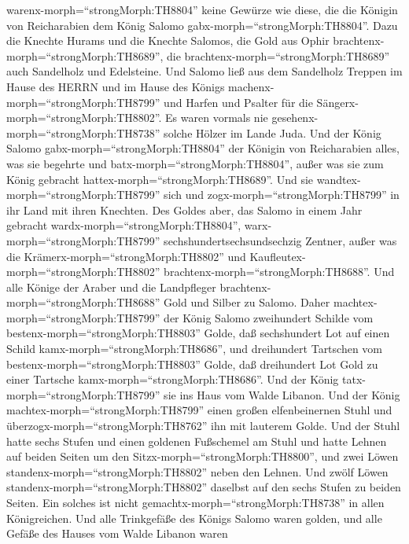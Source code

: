 warenx-morph=``strongMorph:TH8804'' keine Gewürze wie diese, die die
Königin von Reicharabien dem König Salomo
gabx-morph=``strongMorph:TH8804''.  Dazu die Knechte Hurams
und die Knechte Salomos, die Gold aus Ophir
brachtenx-morph=``strongMorph:TH8689'', die
brachtenx-morph=``strongMorph:TH8689'' auch Sandelholz und Edelsteine.
 Und Salomo ließ aus dem Sandelholz Treppen im Hause des
HERRN und im Hause des Königs machenx-morph=``strongMorph:TH8799'' und
Harfen und Psalter für die Sängerx-morph=``strongMorph:TH8802''. Es
waren vormals nie gesehenx-morph=``strongMorph:TH8738'' solche Hölzer im
Lande Juda.  Und der König Salomo
gabx-morph=``strongMorph:TH8804'' der Königin von Reicharabien alles,
was sie begehrte und batx-morph=``strongMorph:TH8804'', außer was sie
zum König gebracht hattex-morph=``strongMorph:TH8689''. Und sie
wandtex-morph=``strongMorph:TH8799'' sich und
zogx-morph=``strongMorph:TH8799'' in ihr Land mit ihren Knechten.
 Des Goldes aber, das Salomo in einem Jahr gebracht
wardx-morph=``strongMorph:TH8804'', warx-morph=``strongMorph:TH8799''
sechshundertsechsundsechzig Zentner,  außer was die
Krämerx-morph=``strongMorph:TH8802'' und
Kaufleutex-morph=``strongMorph:TH8802''
brachtenx-morph=``strongMorph:TH8688''. Und alle Könige der Araber und
die Landpfleger brachtenx-morph=``strongMorph:TH8688'' Gold und Silber
zu Salomo.  Daher machtex-morph=``strongMorph:TH8799'' der
König Salomo zweihundert Schilde vom
bestenx-morph=``strongMorph:TH8803'' Golde, daß sechshundert Lot auf
einen Schild kamx-morph=``strongMorph:TH8686'',  und
dreihundert Tartschen vom bestenx-morph=``strongMorph:TH8803'' Golde,
daß dreihundert Lot Gold zu einer Tartsche
kamx-morph=``strongMorph:TH8686''.  Und der König
tatx-morph=``strongMorph:TH8799'' sie ins Haus vom Walde Libanon. Und
der König machtex-morph=``strongMorph:TH8799'' einen großen
elfenbeinernen Stuhl und überzogx-morph=``strongMorph:TH8762'' ihn mit
lauterem Golde.  Und der Stuhl hatte sechs Stufen und einen
goldenen Fußschemel am Stuhl und hatte Lehnen auf beiden Seiten um den
Sitzx-morph=``strongMorph:TH8800'', und zwei Löwen
standenx-morph=``strongMorph:TH8802'' neben den Lehnen. 
Und zwölf Löwen standenx-morph=``strongMorph:TH8802'' daselbst auf den
sechs Stufen zu beiden Seiten. Ein solches ist nicht
gemachtx-morph=``strongMorph:TH8738'' in allen Königreichen.
 Und alle Trinkgefäße des Königs Salomo waren golden, und
alle Gefäße des Hauses vom Walde Libanon waren

